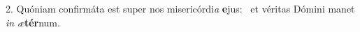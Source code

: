2. Quóniam confirmáta est super nos misericórdi\textit{a} \textbf{e}jus: \ast\  et véritas Dómini manet \textit{in} \textit{æ}\textbf{tér}num.\

